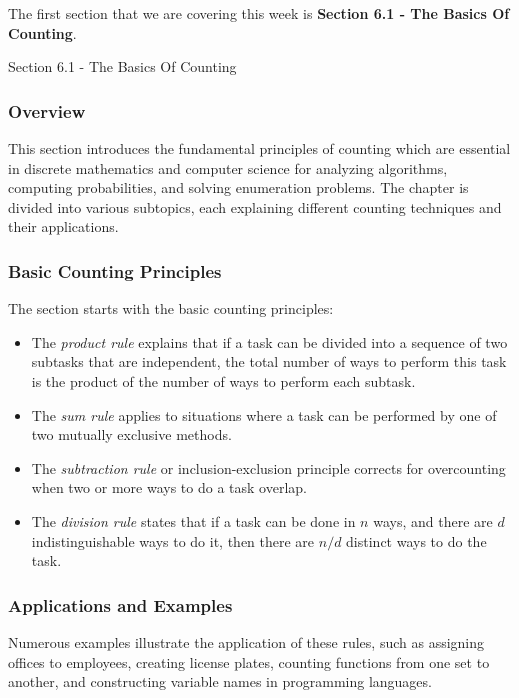 The first section that we are covering this week is \textbf{Section 6.1 - The Basics Of Counting}.

\begin{notes}{Section 6.1 - The Basics Of Counting}
    \subsubsection*{Overview}

    This section introduces the fundamental principles of counting which are essential in discrete mathematics and computer science for analyzing algorithms, computing probabilities, and solving 
    enumeration problems. The chapter is divided into various subtopics, each explaining different counting techniques and their applications. \vspace*{1em}
    
    \subsubsection*{Basic Counting Principles}
    The section starts with the basic counting principles:
    \begin{itemize}
        \item The \textit{product rule} explains that if a task can be divided into a sequence of two subtasks that are independent, the total number of ways to perform this task is the product of 
        the number of ways to perform each subtask.
        \item The \textit{sum rule} applies to situations where a task can be performed by one of two mutually exclusive methods.
        \item The \textit{subtraction rule} or inclusion-exclusion principle corrects for overcounting when two or more ways to do a task overlap.
        \item The \textit{division rule} states that if a task can be done in $ n $ ways, and there are $ d $ indistinguishable ways to do it, then there are $ n/d $ distinct ways to do the task.
    \end{itemize}
    
    \subsubsection*{Applications and Examples}
    Numerous examples illustrate the application of these rules, such as assigning offices to employees, creating license plates, counting functions from one set to another, and constructing variable 
    names in programming languages.
    

\end{notes}
